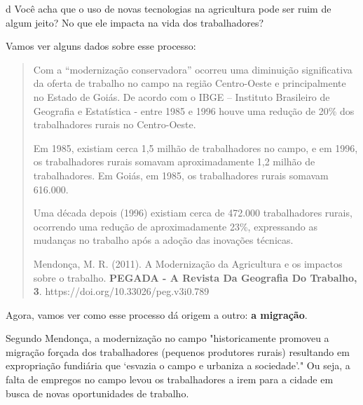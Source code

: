 \num{d} Você acha que o uso de novas tecnologias na agricultura pode ser ruim de
algum jeito? No que ele impacta na vida dos trabalhadores?


Vamos ver alguns dados sobre esse processo:

\begin{quote}
Com a ``modernização conservadora'' ocorreu uma diminuição significativa
da oferta de trabalho no campo na região Centro-Oeste e principalmente
no Estado de Goiás. De acordo com o IBGE -- Instituto Brasileiro de
Geografia e Estatística - entre 1985 e 1996 houve uma redução de 20\%
dos trabalhadores rurais no Centro-Oeste.

Em 1985, existiam cerca 1,5 milhão de trabalhadores no campo, e em 1996,
os trabalhadores rurais somavam aproximadamente 1,2 milhão de
trabalhadores. Em Goiás, em 1985, os trabalhadores rurais somavam
616.000.

Uma década depois (1996) existiam cerca de 472.000 trabalhadores rurais,
ocorrendo uma redução de aproximadamente 23\%, expressando as mudanças
no trabalho após a adoção das inovações técnicas.

Mendonça, M. R. (2011). A Modernização da Agricultura e os impactos
sobre o trabalho. \textbf{PEGADA - A Revista Da Geografia Do Trabalho,
3}. https://doi.org/10.33026/peg.v3i0.789
\end{quote}


Agora, vamos ver como esse processo dá origem a outro: \textbf{a migração}.


Segundo Mendonça, a modernização no campo "historicamente promoveu a
migração forçada dos trabalhadores (pequenos produtores rurais)
resultando em expropriação fundiária que `esvazia o campo e urbaniza a
sociedade'." Ou seja, a falta de empregos no campo levou os
trabalhadores a irem para a cidade em busca de novas oportunidades de
trabalho.

